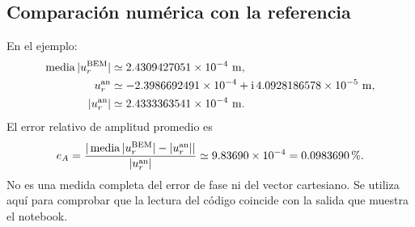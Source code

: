 \documentclass[11pt,a4paper]{article}
\numberwithin{equation}{section}
\newcommand{\ii}{\mathrm{i}}
\begin{document}
\subsection{Comparaci\'on num\'erica con la referencia}
En el ejemplo:
\begin{align}
 \operatorname{media}|u_r^{\rm BEM}|
       &\simeq2.4309427051\times10^{-4}\ {\rm m},\\
 u_r^{\rm an}
       &\simeq-2.3986692491\times10^{-4}
                   +\ii\,4.0928186578\times10^{-5}\ {\rm m},\\
 |u_r^{\rm an}|&\simeq2.4333363541\times10^{-4}\ {\rm m}.
\end{align}
El error relativo de amplitud promedio es
\begin{equation}
 e_A=
 \frac{|\operatorname{media}|u_r^{\rm BEM}|-|u_r^{\rm an}||}
 {|u_r^{\rm an}|}
 \simeq9.83690\times10^{-4}
 =0.0983690\,\%.
\end{equation}
No es una medida completa del error de fase ni del vector cartesiano.
Se utiliza aqu\'i para comprobar que la lectura del c\'odigo coincide
con la salida que muestra el notebook.
\end{document}
